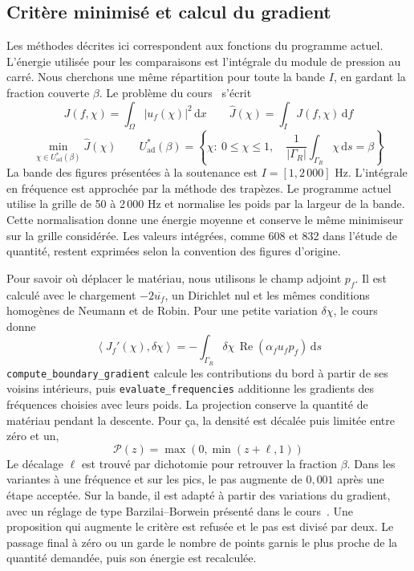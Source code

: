 \documentclass[11pt,a4paper]{article}
\newcommand{\code}[1]{\begingroup\def\UrlBreaks{\do\_\do\/\do\.}\nolinkurl{#1}\endgroup}
\begin{document}
\subsection{Critère minimisé et calcul du gradient}
\label{sec:critere}
Les méthodes décrites ici correspondent aux fonctions du programme actuel. L'énergie utilisée pour les comparaisons est l'intégrale du module de pression au carré. Nous cherchons une même répartition pour toute la bande $I$, en gardant la fraction couverte $\beta$. Le problème du cours~\cite{cours} s'écrit
\begin{equation*}
J(f,\chi)=\int_\Omega |u_f(\chi)|^2\,\mathrm dx
\qquad
\widehat J(\chi)=\int_I J(f,\chi)\,\mathrm df
\end{equation*}
\begin{equation*}
\min_{\chi\in U_{\mathrm{ad}}^*(\beta)}\widehat J(\chi)
\qquad
U_{\mathrm{ad}}^*(\beta)=
\left\{\chi:\ 0\leq\chi\leq1,\quad
\frac{1}{|\Gamma_R|}\int_{\Gamma_R}\chi\,\mathrm ds=\beta\right\}
\end{equation*}
La bande des figures présentées à la soutenance est $I=[1,2\,000]$ Hz. L'intégrale en fréquence est approchée par la méthode des trapèzes. Le programme actuel utilise la grille de 50 à 2\,000 Hz et normalise les poids par la largeur de la bande. Cette normalisation donne une énergie moyenne et conserve le même minimiseur sur la grille considérée. Les valeurs intégrées, comme 608 et 832 dans l'étude de quantité, restent exprimées selon la convention des figures d'origine.

Pour savoir où déplacer le matériau, nous utilisons le champ adjoint $p_f$. Il est calculé avec le chargement $-2\overline{u_f}$, un Dirichlet nul et les mêmes conditions homogènes de Neumann et de Robin. Pour une petite variation $\delta\chi$, le cours~\cite{cours} donne
\begin{equation*}
\left\langle J_f'(\chi),\delta\chi\right\rangle
=-\int_{\Gamma_R}\delta\chi\,
\operatorname{Re}\!\left(\alpha_f u_f p_f\right)\,\mathrm ds
\end{equation*}
\code{compute_boundary_gradient} calcule les contributions du bord à partir de ses voisins intérieurs, puis \code{evaluate_frequencies} additionne les gradients des fréquences choisies avec leurs poids. La projection conserve la quantité de matériau pendant la descente. Pour ça, la densité est décalée puis limitée entre zéro et un,
\begin{equation*}
\mathcal P(z)=\max\!\left(0,\min(z+\ell,1)\right)
\end{equation*}
Le décalage $\ell$ est trouvé par dichotomie pour retrouver la fraction $\beta$. Dans les variantes à une fréquence et sur les pics, le pas augmente de $0{,}001$ après une étape acceptée. Sur la bande, il est adapté à partir des variations du gradient, avec un réglage de type Barzilai--Borwein présenté dans le cours~\cite{cours}. Une proposition qui augmente le critère est refusée et le pas est divisé par deux. Le passage final à zéro ou un garde le nombre de points garnis le plus proche de la quantité demandée, puis son énergie est recalculée.
\end{document}
